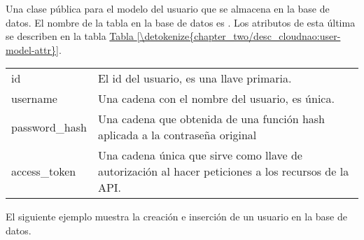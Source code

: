 \begin{fulllineitems}
\label{\detokenize{chapter_two/desc_cloudnao:app.models.user_model.UserModel}}
Una clase pública para el modelo del usuario que se almacena en la base
de datos.
El nombre de la tabla en la base de datos es . Los atributos de esta
última se describen en la tabla \hyperref[\detokenize{chapter_two/desc_cloudnao:user-model-attr}]{Tabla \ref{\detokenize{chapter_two/desc_cloudnao:user-model-attr}}}.


\begin{savenotes}\sphinxattablestart
\centering
{}
\label{\detokenize{chapter_two/desc_cloudnao:user-model-attr}}
\sphinxaftercaption
\begin{tabulary}{\linewidth}[t]{|T|T|}
\hline
{}\relax &\relax \\
\hline
id
&
El id del usuario, es una llave primaria.
\\
\hline
username
&
Una cadena con el nombre del usuario, es única.
\\
\hline
password\_hash
&
Una cadena que obtenida de una función hash aplicada a la contraseña original
\\
\hline
access\_token
&
Una cadena única que sirve como llave de autorización al hacer peticiones a los recursos de la API.
\\
\hline
\end{tabulary}
\par
\sphinxattableend\end{savenotes}

El siguiente ejemplo muestra la creación e inserción de un usuario en la
base de datos.


\end{fulllineitems}
